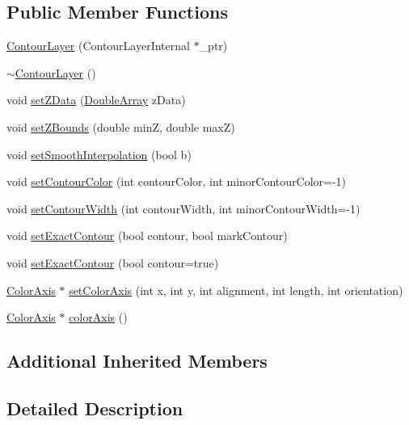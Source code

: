 \subsection*{Public Member Functions}
\begin{DoxyCompactItemize}
\item 
\hyperlink{class_contour_layer_a5f7d9b41aefd4c3915b7167c11c4eb47}{Contour\+Layer} (Contour\+Layer\+Internal $\ast$\+\_\+ptr)
\item 
\hyperlink{class_contour_layer_a4eb428d8bf191deb9682316a31981a9c}{$\sim$\+Contour\+Layer} ()
\item 
void \hyperlink{class_contour_layer_a8588a9186e0790c8981284879602ba2c}{set\+Z\+Data} (\hyperlink{class_double_array}{Double\+Array} z\+Data)
\item 
void \hyperlink{class_contour_layer_ab83ec20fae511da1fc07f63f5fded683}{set\+Z\+Bounds} (double minZ, double maxZ)
\item 
void \hyperlink{class_contour_layer_a5670bc76e3eed0a1bb14e77caa5c497b}{set\+Smooth\+Interpolation} (bool b)
\item 
void \hyperlink{class_contour_layer_a07bfa5eda9372670326d4810262f907f}{set\+Contour\+Color} (int contour\+Color, int minor\+Contour\+Color=-\/1)
\item 
void \hyperlink{class_contour_layer_a66ed82e9a4f37eae9bde3e3e787cfd15}{set\+Contour\+Width} (int contour\+Width, int minor\+Contour\+Width=-\/1)
\item 
void \hyperlink{class_contour_layer_ad24edcf3dde8cdf7530b67431177679f}{set\+Exact\+Contour} (bool contour, bool mark\+Contour)
\item 
void \hyperlink{class_contour_layer_a3eaad97db2f9436f73922c9922049db3}{set\+Exact\+Contour} (bool contour=true)
\item 
\hyperlink{class_color_axis}{Color\+Axis} $\ast$ \hyperlink{class_contour_layer_a4ca46ccb1a8011f8e9ac33a42efcdf34}{set\+Color\+Axis} (int x, int y, int alignment, int length, int orientation)
\item 
\hyperlink{class_color_axis}{Color\+Axis} $\ast$ \hyperlink{class_contour_layer_a0556505096c28150c6ba6768cfaee356}{color\+Axis} ()
\end{DoxyCompactItemize}
\subsection*{Additional Inherited Members}


\subsection{Detailed Description}


